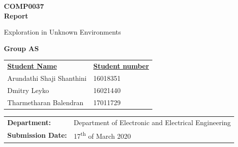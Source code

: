 \documentclass[a4paper,12pt]{article}
\begin{document}
	\selectfont
	\begin{titlepage}
		\setlength{\voffset}{-0.8in}
		\noindent {}
	
			\vspace{15mm}
			
			\begin{center}
				{\Huge \textbf{COMP0037 \\ \vspace{10mm} Report}}
			
				\vspace{8mm}
			
				\begin{spacing}{1.8}
					{\huge Exploration in Unknown Environments}
				\end{spacing}
		
			
				\vspace{12mm}
			
				{\LARGE \textbf{Group AS}}
				
				\vspace{10mm}
				
				\begin{tabular}{ll}
					\underline{\textbf{Student Name}}  & \hspace{4mm} \underline{\textbf{Student number}} \vspace{2mm} \\
					Arundathi Shaji Shanthini & \hspace{4mm} 16018351 \\ 
					Dmitry Leyko & \hspace{4mm}  16021440\\ 
					Tharmetharan Balendran & \hspace{4mm} 17011729\\ 
				\end{tabular}
				
				\vspace{13mm}
				
				\begin{tabular}{ll}
					\textbf{Department:} &  Department of Electronic and Electrical Engineering\\ \vspace{3mm}
					\textbf{Submission Date:} &  17\textsuperscript{th} of March 2020
				\end{tabular}
			\end{center}
	\end{titlepage}
	
\end{document}
